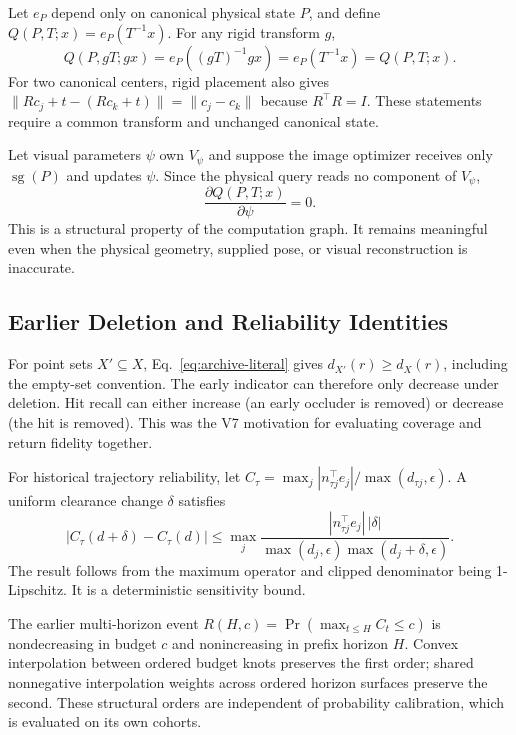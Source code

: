 Let $e_P$ depend only on canonical physical state $P$, and define $Q(P,T;x)=e_P(T^{-1}x)$.
For any rigid transform $g$,
\begin{equation}
Q(P,gT;gx)=e_P((gT)^{-1}gx)=e_P(T^{-1}x)=Q(P,T;x).
\end{equation}
For two canonical centers, rigid placement also gives
$\|Rc_j+t-(Rc_k+t)\|=\|c_j-c_k\|$ because $R^\top R=I$.
These statements require a common transform and unchanged canonical state.

Let visual parameters $\psi$ own $V_\psi$ and suppose the image optimizer receives only
$\operatorname{sg}(P)$ and updates $\psi$.
Since the physical query reads no component of $V_\psi$,
\begin{equation}
\frac{\partial Q(P,T;x)}{\partial\psi}=0.
\end{equation}
This is a structural property of the computation graph.
It remains meaningful even when the physical geometry, supplied pose, or visual reconstruction is inaccurate.

\subsection{Earlier Deletion and Reliability Identities}

For point sets $X'\subseteq X$, Eq.~\ref{eq:archive-literal} gives
$d_{X'}(r)\geq d_X(r)$, including the empty-set convention.
The early indicator can therefore only decrease under deletion.
Hit recall can either increase (an early occluder is removed) or decrease (the hit is removed).
This was the V7 motivation for evaluating coverage and return fidelity together.

For historical trajectory reliability, let
$C_\tau=\max_j |n_{\tau j}^{\top}e_j|/\max(d_{\tau j},\epsilon)$.
A uniform clearance change $\delta$ satisfies
\begin{equation}
|C_\tau(d+\delta)-C_\tau(d)|
\leq\max_j\frac{|n_{\tau j}^{\top}e_j|\,|\delta|}
{\max(d_j,\epsilon)\max(d_j+\delta,\epsilon)}.
\end{equation}
The result follows from the maximum operator and clipped denominator being 1-Lipschitz.
It is a deterministic sensitivity bound.

The earlier multi-horizon event $R(H,c)=
\Pr(\max_{t\leq H}C_t\leq c)$ is nondecreasing in budget $c$ and nonincreasing in prefix horizon $H$.
Convex interpolation between ordered budget knots preserves the first order; shared nonnegative interpolation
weights across ordered horizon surfaces preserve the second.
These structural orders are independent of probability calibration, which is evaluated on its own cohorts.
